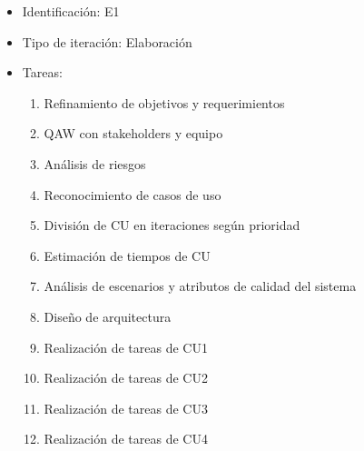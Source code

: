 \begin{itemize}
\item Identificación: E1
\item Tipo de iteración: Elaboración
\item Tareas:
	\begin{enumerate}
	\item Refinamiento de objetivos y requerimientos
	\item QAW con stakeholders y equipo
	\item Análisis de riesgos
	\item Reconocimiento de casos de uso
	\item División de CU en iteraciones según prioridad
	\item Estimación de tiempos de CU
	\item Análisis de escenarios y atributos de calidad del sistema
	\item Diseño de arquitectura
	\item Realización de tareas de CU1
	\item Realización de tareas de CU2
	\item Realización de tareas de CU3
	\item Realización de tareas de CU4	
	\end{enumerate}
\end{itemize}

